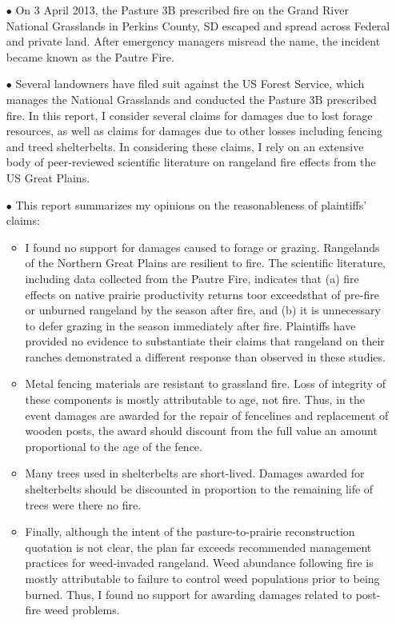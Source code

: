 \begin{itemize} 
	\item[$\bullet$] On 3 April 2013, the Pasture 3B prescribed fire on the Grand River National Grasslands in Perkins County, SD escaped and spread across Federal and private land. 
	After emergency managers misread the name, the incident became known as the Pautre Fire. 

	\item[$\bullet$] Several landowners have filed suit against the US Forest Service, which manages the National Grasslands and conducted the Pasture 3B prescribed fire. 
	In this report, I consider several claims for damages due to lost forage resources, as well as claims for damages due to other losses including fencing and treed shelterbelts. 
	In considering these claims, I rely on an extensive body of peer-reviewed scientific literature on rangeland fire effects from the US Great Plains. 
	
	\item[$\bullet$] This report summarizes my opinions on the reasonableness of plaintiffs' claims: 
	
	\begin{itemize}
		\item I found no support for damages caused to forage or grazing. 
		Rangelands of the Northern Great Plains are resilient to fire. 
		The scientific literature, including data collected from the Pautre Fire, indicates that (a) fire effects on native prairie productivity returns to\textemdash or exceeds\textemdash that of pre-fire or unburned rangeland by the season after fire, and (b) it is unnecessary to defer grazing in the season immediately after fire.
		Plaintiffs have provided no evidence to substantiate their claims that rangeland on their ranches demonstrated a different response than observed in these studies.
		
		\item Metal fencing materials are resistant to grassland fire. 
		Loss of integrity of these components is mostly attributable to age, not fire. 
		Thus, in the event damages are awarded for the repair of fencelines and replacement of wooden posts, the award should discount from the full value an amount proportional to the age of the fence. 
		
		\item Many trees used in shelterbelts are short-lived. 
		Damages awarded for shelterbelts should be discounted in proportion to the remaining life of trees were there no fire.
		
		\item Finally, although the intent of the pasture-to-prairie reconstruction quotation is not clear, the plan far exceeds recommended management practices for weed-invaded rangeland. 
		Weed abundance following fire is mostly attributable to failure to control weed populations prior to being burned. 
		Thus, I found no support for awarding damages related to post-fire weed problems.    
	\end{itemize}
\end{itemize}